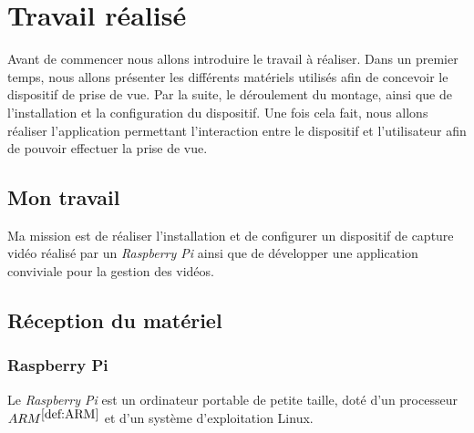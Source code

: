 \chapter{Travail réalisé}
    Avant de commencer nous allons introduire le travail à réaliser. Dans un premier temps, nous allons présenter les différents matériels utilisés afin de concevoir le dispositif de prise de vue. Par la suite, le déroulement du montage, ainsi que de l'installation et la configuration du dispositif. Une fois cela fait, nous allons réaliser l'application permettant l'interaction entre le dispositif et l'utilisateur afin de pouvoir effectuer la prise de vue.
    
    \section{Mon travail}
        Ma mission est de réaliser l'installation et de configurer un dispositif de capture vidéo réalisé par un \textit{Raspberry Pi} ainsi que de développer une application conviviale pour la gestion des vidéos.
 
    \section{Réception du matériel}
        \subsection{Raspberry Pi}
        Le \textit{Raspberry Pi} est un ordinateur portable de petite taille, doté d'un processeur \underline{$ ARM^{\ref{def:ARM}}$}  et d'un système d'exploitation Linux.



        \vspace{0.2cm}

